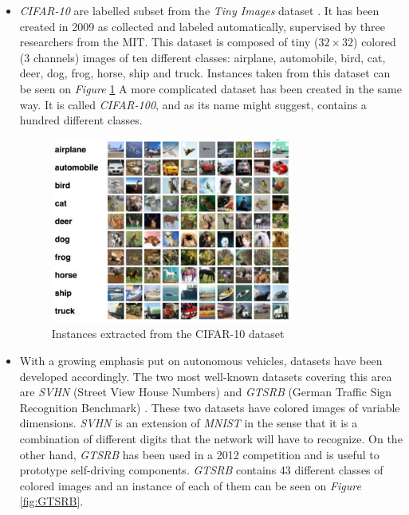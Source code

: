 \begin{itemize}
  \item \emph{CIFAR-10} are labelled subset from the \emph{Tiny Images} dataset \cite{Krizhevsky2009}. It has been created in 2009 as collected and labeled automatically, supervised by three researchers from the MIT. This dataset is composed of tiny ($32 \times 32$) colored (3 channels) images of ten different classes: airplane, automobile, bird, cat, deer, dog, frog, horse, ship and truck. Instances taken from this dataset can be seen on \emph{Figure} \ref{fig:CIFAR-10} A more complicated dataset has been created in the same way. It is called \emph{CIFAR-100}, and as its name might suggest, contains a hundred different classes.

  \begin{figure}[htbp]
  	\centering
  		\includegraphics[width=8cm]{Figures/CIFAR-10.jpg}
  	\caption[CIFAR-10]{Instances extracted from the CIFAR-10 dataset}
  	\label{fig:CIFAR-10}
  \end{figure}

  \item With a growing emphasis put on autonomous vehicles, datasets have been developed accordingly. The two most well-known datasets covering this area are \emph{SVHN} (Street View House Numbers) \cite{Netzer2011} and \emph{GTSRB} (German Traffic Sign Recognition Benchmark) \cite{Stallkamp2012}. These two datasets have colored images of variable dimensions. \emph{SVHN} is an extension of \emph{MNIST} in the sense that it is a combination of different digits that the network will have to recognize. On the other hand, \emph{GTSRB} has been used in a 2012 competition and is useful to prototype self-driving components. \emph{GTSRB} contains 43 different classes of colored images and an instance of each of them can be seen on \emph{Figure} \ref{fig:GTSRB}.



\end{itemize}
